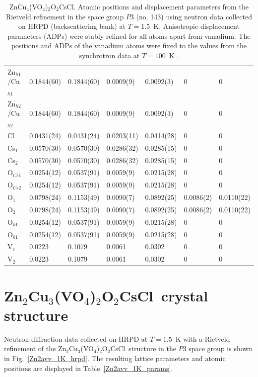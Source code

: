 \documentclass[
sn-mathphys,
Numbered,
onecolumn]
{sn-jnl}%
\newcommand{\znave}{ZnCu$_4$(VO$_4$)$_{2}$O$_2$CsCl}
\newcommand{\zntwoave}{Zn$_2$Cu$_3$(VO$_4$)$_{2}$O$_2$CsCl}
\begin{document}
\begin{table}
\begin{tabular}{ p{2cm} p{1.8cm} p{2cm} p{} p{} p{} p{}}
Zn$_{h1}$/Cu$_{h1}$ & 0.1844(60) & 0.1844(60) & 0.0009(9) & 0.0092(3) & 0 & 0 \\
Zn$_{h2}$/Cu$_{h2}$ & 0.1844(60) & 0.1844(60) & 0.0009(9) & 0.0092(3) & 0 & 0 \\
Cl & 0.0431(24) & 0.0431(24) & 0.0203(11) & 0.0414(28) & 0 & 0 \\
Cs$_1$ &  0.0570(30) & 0.0570(30) & 0.0286(32) & 0.0285(15) & 0 & 0 \\
Cs$_2$ &  0.0570(30) & 0.0570(30) & 0.0286(32) & 0.0285(15) & 0 & 0 \\
O$_{Cs1}$ & 0.0254(12) & 0.0537(91) & 0.0059(9) & 0.0215(28) & 0 & 0  \\
O$_{Cs2}$ & 0.0254(12) & 0.0537(91) & 0.0059(9) & 0.0215(28) & 0 & 0  \\ 
O$_1$ & 0.0798(24) & 0.1153(49) & 0.0090(7) & 0.0892(25) & 0.0086(2) & 0.0110(22)  \\
O$_2$ & 0.0798(24) & 0.1153(49) & 0.0090(7) & 0.0892(25) & 0.0086(2) & 0.0110(22)  \\
O$_{k1}$ & 0.0254(12) & 0.0537(91) & 0.0059(9) & 0.0215(28) & 0 & 0  \\
O$_{k1}$ & 0.0254(12) & 0.0537(91) & 0.0059(9) & 0.0215(28) & 0 & 0  \\
V$_1$ & 0.0223 & 0.1079  & 0.0061 &  0.0302   & 0 & 0 \\
V$_2$    & 0.0223 & 0.1079  & 0.0061 &  0.0302   & 0 & 0 
 \\ \hline \hline
   
\end{tabular}
    \caption{\znave. Atomic positions and displacement parameters from the Rietveld refinement in the space group $P3$ (no. 143) using neutron data collected on HRPD (backscattering bank) at $T=1.5$~K. Anisotropic displacement parameters (ADPs) were stably refined for all atoms apart from vanadium. The positions and ADPs of the vanadium atoms were fixed to the values from the synchrotron data at $T=100$~K .}
    \label{Znavv_1K_params}
\end{table}

\clearpage
\section{\zntwoave\ crystal structure}

Neutron diffraction data collected on HRPD at $T=1.5$~K with a Rietveld refinement of the \zntwoave\ structure in the $P3$ space group is shown in Fig.~\ref{Zn2avv_1K_hrpd}. 
The resulting lattice parameters and atomic positions are displayed in Table~\ref{Zn2avv_1K_params}.
\end{document}
